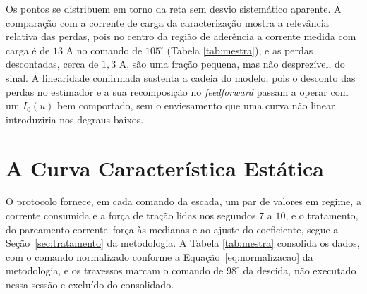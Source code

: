 Os pontos se distribuem em torno da reta sem desvio sistemático aparente. A comparação com a
corrente de carga da caracterização mostra a relevância relativa das perdas, pois no centro
da região de aderência a corrente medida com carga é de $13$ A no comando de $105^\circ$
(Tabela \ref{tab:mestra}), e as perdas descontadas, cerca de $1{,}3$ A, são uma fração
pequena, mas não desprezível, do sinal. A linearidade confirmada sustenta a cadeia do modelo, pois o desconto das perdas no
estimador e a sua recomposição no \emph{feedforward} passam a operar com um $I_0(u)$ bem
comportado, sem o enviesamento que uma curva não linear introduziria nos degraus baixos.

\section{A Curva Característica Estática}
\label{sec:restracao}

O protocolo fornece, em cada comando da escada, um par de valores em regime, a corrente
consumida e a força de tração lidas nos segundos $7$ a $10$, e o tratamento, do pareamento
corrente--força às medianas e ao ajuste do coeficiente, segue a
Seção~\ref{sec:tratamento} da metodologia. A Tabela \ref{tab:mestra} consolida os dados,
com o comando normalizado conforme a Equação~\eqref{eq:normalizacao} da metodologia, e os
travessos marcam o comando de $98^\circ$ da descida, não executado nessa sessão e excluído
do consolidado.

